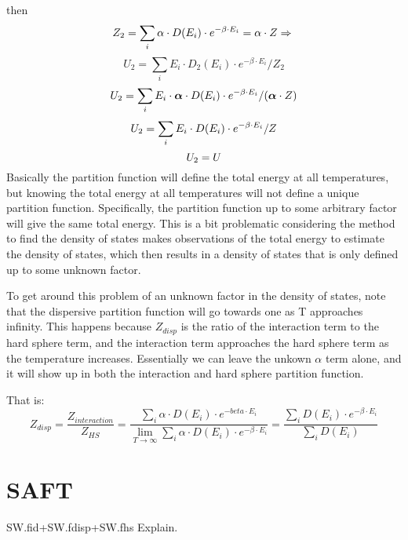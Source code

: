 then $$Z_2=\sum_i \alpha\cdot D(E_i)\cdot e^{-\beta\cdot E_i}=\alpha\cdot Z\Rightarrow\newline$$
$$U_2=\sum_i E_i\cdot D_2(E_i)\cdot e^{-\beta\cdot E_i}/Z_2$$
$$\newline U_2=\sum_i E_i\cdot \boldsymbol{\alpha}\cdot D(E_i)\cdot e^{-\beta\cdot E_i}/(\boldsymbol{\alpha}\cdot Z)$$
$$\newline U_2=\sum_i E_i\cdot D(E_i)\cdot e^{-\beta\cdot E_i}/Z$$
$$\newline U_2=U\newline$$
Basically the partition function will define the total energy at all temperatures, but knowing the total energy at all temperatures will not define a unique partition function. Specifically, the partition function up to some arbitrary factor will give the same total energy. This is a bit problematic considering the method to find the density of states makes observations of the total energy to estimate the density of states, which then results in a density of states that is only defined up to some unknown factor.

To get around this problem of an unknown factor in the density of states, note that the dispersive partition function will go towards one as T approaches infinity. This happens because $Z_{disp}$ is the ratio of the interaction term to the hard sphere term, and the interaction term approaches the hard sphere term as the temperature increases. Essentially we can leave the unkown $\alpha$ term alone, and it will show up in both the interaction and hard sphere partition function.

That is: $$Z_{disp}=\frac{Z_{interaction}}{Z_{HS}}=\frac{\sum_i \alpha\cdot D(E_i)\cdot e^{-beta\cdot E_i}}{\lim_{T\to\infty}\sum_i \alpha\cdot D(E_i)\cdot e^{-\beta\cdot E_i}}=\frac{\sum_i D(E_i)\cdot e^{-\beta\cdot E_i}}{\sum_i D(E_i)}$$

\section{SAFT}
SW.fid+SW.fdisp+SW.fhs Explain.



